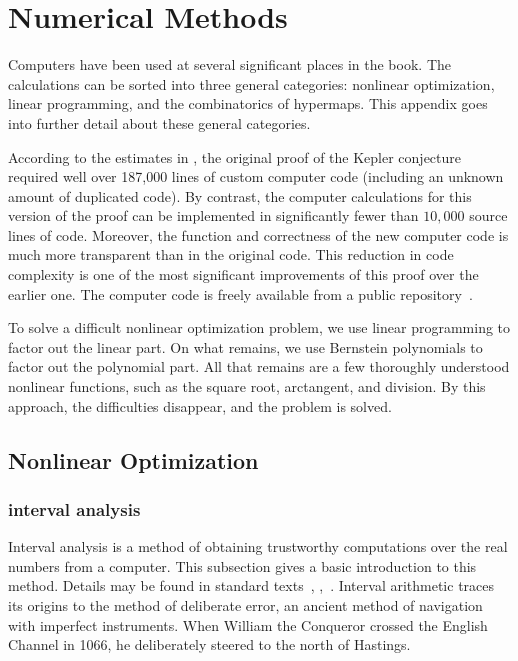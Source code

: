 %
\chapter{Numerical Methods}

Computers have been used at several significant places in the book.
The calculations can be sorted into three general categories:
nonlinear optimization, linear programming, and the combinatorics of
hypermaps. This appendix goes into further detail about these general
categories.

According to the estimates in \cite{HHMNOZ}, the original proof of
the Kepler conjecture required well over 187,000 lines of custom
computer code (including an unknown amount of duplicated code).  By
contrast, the computer calculations for this version of the proof can
be implemented in significantly fewer than $10,000$ source lines of code.
Moreover, the function and correctness of the new computer code is
much more transparent than in the original code.  This reduction in
code complexity is one of the most significant improvements of this
proof over the earlier one.  The computer code is freely available
from a public repository~\cite{website:FlyspeckProject}.

To solve a difficult nonlinear optimization problem, we use linear
programming to factor out the linear part.  On what remains, we use
Bernstein polynomials to factor out the polynomial part.  All that
remains are a few thoroughly understood nonlinear functions, such as
the square root, arctangent, and division.  By this approach, the difficulties
disappear, and the problem is solved.


\section{Nonlinear Optimization}

\subsection{interval analysis}%
\label{sec:bounds-simplex}

Interval analysis is a method of obtaining trustworthy computations
over the real numbers from a computer.  This subsection gives a basic
introduction to this method.  Details may be found in standard
texts~\cite{Kearfott:1996:Interval},
\cite{Moore:1966:IntervalAnalysis},~\cite{Moore:2009:IntroIntAnalysis}.
Interval arithmetic  traces its
origins to the method of deliberate error,  an ancient method
of navigation with imperfect instruments.  When William the Conqueror
crossed the English Channel in 1066, he deliberately steered to the
north of Hastings.

